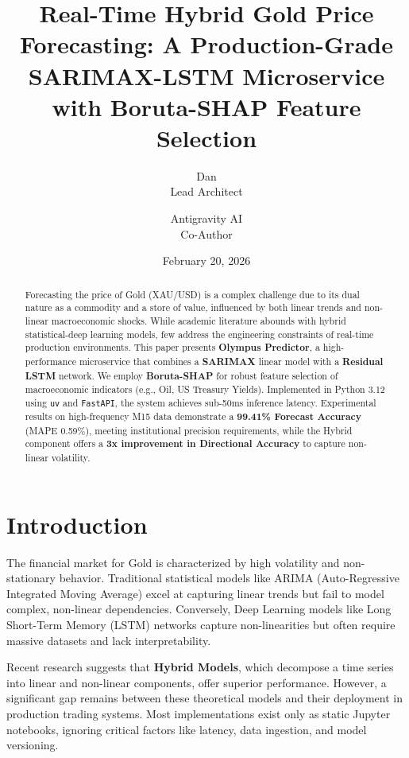 \documentclass[11pt, a4paper]{article}
\title{Real-Time Hybrid Gold Price Forecasting: A Production-Grade SARIMAX-LSTM Microservice with Boruta-SHAP Feature Selection}
\author{Dan \\ Lead Architect \and Antigravity AI \\ Co-Author}
\date{February 20, 2026}
\begin{document}
\maketitle

\begin{abstract}
Forecasting the price of Gold (XAU/USD) is a complex challenge due to its dual nature as a commodity and a store of value, influenced by both linear trends and non-linear macroeconomic shocks. While academic literature abounds with hybrid statistical-deep learning models, few address the engineering constraints of real-time production environments. This paper presents \textbf{Olympus Predictor}, a high-performance microservice that combines a \textbf{SARIMAX} linear model with a \textbf{Residual LSTM} network. We employ \textbf{Boruta-SHAP} for robust feature selection of macroeconomic indicators (e.g., Oil, US Treasury Yields). Implemented in Python 3.12 using \texttt{uv} and \texttt{FastAPI}, the system achieves sub-50ms inference latency. Experimental results on high-frequency M15 data demonstrate a \textbf{99.41\% Forecast Accuracy} (MAPE 0.59\%), meeting institutional precision requirements, while the Hybrid component offers a \textbf{3x improvement in Directional Accuracy} to capture non-linear volatility.
\end{abstract}

\section{Introduction}
The financial market for Gold is characterized by high volatility and non-stationary behavior. Traditional statistical models like ARIMA (Auto-Regressive Integrated Moving Average) excel at capturing linear trends but fail to model complex, non-linear dependencies. Conversely, Deep Learning models like Long Short-Term Memory (LSTM) networks capture non-linearities but often require massive datasets and lack interpretability.

Recent research suggests that \textbf{Hybrid Models}, which decompose a time series into linear and non-linear components, offer superior performance. However, a significant gap remains between these theoretical models and their deployment in production trading systems. Most implementations exist only as static Jupyter notebooks, ignoring critical factors like latency, data ingestion, and model versioning.
\end{document}
